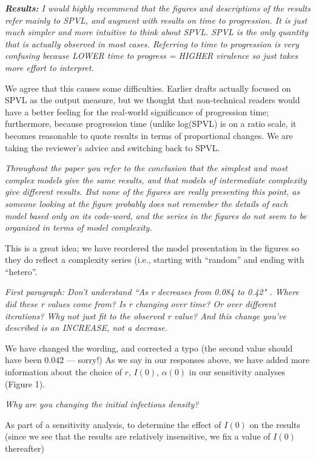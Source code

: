\documentclass[10pt]{letter}
\newcommand{\revcomment}[1]{\emph{#1}}
\newcommand{\response}[1]{#1}
\begin{document}
\begin{letter}{
}
\revcomment{\textbf{Results:}
I would highly recommend that the figures and descriptions of the results refer mainly to SPVL, and augment with results on time to progression. It is just much simpler and more intuitive to think about SPVL. SPVL is the only quantity that is actually observed in most cases. Referring to time to progression is very confusing because LOWER time to progress = HIGHER virulence so just takes more effort to interpret.
}

\response{
We agree that this causes some difficulties. Earlier drafts
actually focused on SPVL as the output measure, but we thought
that non-technical readers would have a better feeling for the
real-world significance of progression time; furthermore, because
progression time (unlike log(SPVL) is on a ratio scale, it becomes
reasonable to quote results in terms of proportional changes. 
We are taking the reviewer's advice and switching back to SPVL.
}

\revcomment{
Throughout the paper you refer to the conclusion that the simplest and most complex models give the same results, and that models of intermediate complexity give different results. But none of the figures are really presenting this point, as someone looking at the figure probably does not remember the details of each model based only on its code-word, and the series in the figures do not seem to be organized in terms of model complexity.
}

\response{
This is a great idea; we have reordered the model presentation in the figures so they do reflect a complexity series (i.e., starting with ``random'' and ending with ``hetero''.
}

\revcomment{
First paragraph: Don’t understand “As r decreases from 0.084 to 0.42" . Where did these r values come from? Is r changing over time? Or over different iterations? Why not just fit to the observed r value? And this change you’ve described is an INCREASE, not a decrease.
}

\response{
We have changed the wording, and corrected a typo (the second value should have been 0.042 --- sorry!) As we say in our responses above, we have added more information about the choice of $r$, $I(0)$, $\alpha(0)$ in our sensitivity analyses (Figure 1).
}

\revcomment{
Why are you changing the initial infectious density?
}

\response{As part of a sensitivity analysis, to determine the effect of $I(0)$ on the results (since we see that the results are relatively insensitive, we fix a value of $I(0)$ thereafter)
}


\end{letter}
\end{document}
